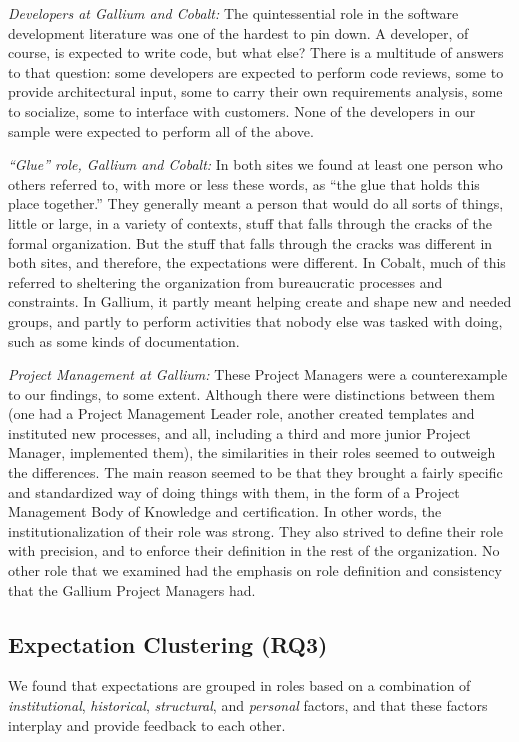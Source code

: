 \documentclass[10pt, conference, compsocconf]{IEEEtran}
\begin{document}
\emph{Developers at Gallium and Cobalt:} The quintessential role in the software development literature was one of the hardest to pin down. A developer, of course, is expected to write code, but what else? There is a multitude of answers to that question: some developers are expected to perform code reviews, some to provide architectural input, some to carry their own requirements analysis, some to socialize, some to interface with customers. None of the developers in our sample were expected to perform all of the above.

\emph{``Glue'' role, Gallium and Cobalt:} In both sites we found at least one person who others referred to, with more or less these words, as ``the glue that holds this place together.'' They generally meant a person that would do all sorts of things, little or large, in a variety of contexts, stuff that falls through the cracks of the formal organization. But the stuff that falls through the cracks was different in both sites, and therefore, the expectations were different. In Cobalt, much of this referred to sheltering the organization from bureaucratic processes and constraints. In Gallium, it partly meant helping create and shape new and needed groups, and partly to perform activities that nobody else was tasked with doing, such as some kinds of documentation.

\emph{Project Management at Gallium:} These Project Managers were a counterexample to our findings, to some extent. Although there were distinctions between them (one had a Project Management Leader role, another created templates and instituted new processes, and all, including a third and more junior Project Manager, implemented them), the similarities in their roles seemed to outweigh the differences. The main reason seemed to be that they brought a fairly specific and standardized way of doing things with them, in the form of a Project Management Body of Knowledge and certification. In other words, the institutionalization of their role was strong. They also strived to define their role with precision, and to enforce their definition in the rest of the organization. No other role that we examined had the emphasis on role definition and consistency that the Gallium Project Managers had.


\subsection{Expectation Clustering (RQ3)}

We found that expectations are grouped in roles based on a combination of \emph{institutional}, \emph{historical}, \emph{structural}, and \emph{personal} factors, and that these factors interplay and provide feedback to each other. 
\end{document}
